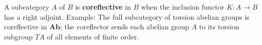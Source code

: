 A subcategory $A$ of $B$ is \textbf{coreflective} in $B$ when the inclusion functor $K: A \to B$ has a right adjoint. Example: The full subcategory of torsion abelian groups is coreflective in $\mathbf{Ab}$; the coreflector sends each abelian group $A$ to its torsion subgroup $TA$ of all elements of finite order.
